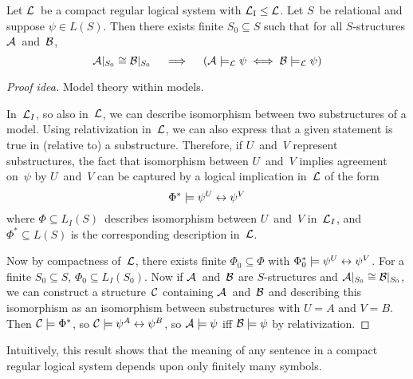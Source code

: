 \begin{lem}
Let \(\mathcal{L}\)~be a compact regular logical system with \(\mathcal{L}_{\mathrm{I}}\le\mathcal{L}\). Let \(S\)~be relational and suppose \(\psi\in L(S)\). Then there exists finite \(S_0\subseteq S\) such that for all \(S\)-structures \(\mathcal{A}\)~and~\(\mathcal{B}\),
\[\mathcal{A}|_{S_0}\cong\mathcal{B}|_{S_0}\quad\implies\quad(\mathcal{A}\models_{\mathcal{L}}\psi\iff\mathcal{B}\models_{\mathcal{L}}\psi)\]
\end{lem}
\begin{proof}[Proof idea]
Model theory within models.

In~\(\mathcal{L}_I\), so also in~\(\mathcal{L}\), we can describe isomorphism between two substructures of a model. Using relativization in~\(\mathcal{L}\), we can also express that a given statement is true in (relative to) a substructure. Therefore, if \(U\)~and~\(V\) represent substructures, the fact that isomorphism between \(U\)~and~\(V\) implies agreement on~\(\psi\) by \(U\)~and~\(V\) can be captured by a logical implication in~\(\mathcal{L}\) of the form
\[\Phi^*\models\psi^U\leftrightarrow\psi^V\]
where \(\Phi\subseteq L_I(S)\)~describes isomorphism between \(U\)~and~\(V\) in~\(\mathcal{L}_I\), and \(\Phi^*\subseteq L(S)\) is the corresponding description in~\(\mathcal{L}\).

Now by compactness of~\(\mathcal{L}\), there exists finite \(\Phi_0\subseteq\Phi\) with \(\Phi_0^*\models\psi^U\leftrightarrow\psi^V\). For a finite \(S_0\subseteq S\), \(\Phi_0\subseteq L_I(S_0)\). Now if \(\mathcal{A}\)~and~\(\mathcal{B}\) are \(S\)-structures and \(\mathcal{A}|_{S_0}\cong\mathcal{B}|_{S_0}\), we can construct a structure~\(\mathcal{C}\) containing \(\mathcal{A}\)~and~\(\mathcal{B}\) and describing this isomorphism as an isomorphism between substructures with \(U=A\) and \(V=B\). Then \(\mathcal{C}\models\Phi^*\), so \(\mathcal{C}\models\psi^A\leftrightarrow\psi^B\), so \(\mathcal{A}\models\psi\) iff \(\mathcal{B}\models\psi\) by relativization.
\end{proof}
\begin{rmk}
Intuitively, this result shows that the meaning of any sentence in a compact regular logical system depends upon only finitely many symbols.
\end{rmk}

